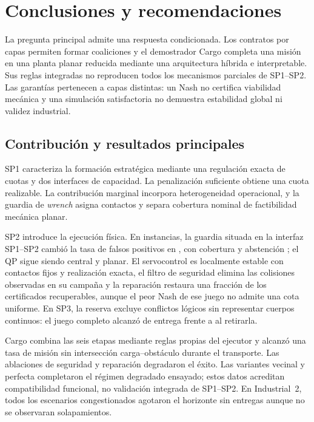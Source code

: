 \section{Conclusiones y recomendaciones}
\label{sec:conclusions}

La pregunta principal admite una respuesta condicionada. Los contratos por
capas permiten formar coaliciones y el demostrador Cargo completa una misión en
una planta planar reducida mediante una arquitectura híbrida e interpretable.
Sus reglas integradas no reproducen todos los mecanismos parciales de SP1--SP2. Las
garantías pertenecen a capas distintas: un Nash no certifica viabilidad mecánica
y una simulación satisfactoria no demuestra estabilidad global ni validez
industrial.

\subsection{Contribución y resultados principales}

SP1 caracteriza la formación estratégica mediante una regulación exacta de
cuotas y dos interfaces de capacidad. La penalización suficiente obtiene una
cuota realizable. La contribución marginal incorpora heterogeneidad operacional, y la guardia de \emph{wrench}
asigna contactos y separa cobertura nominal de factibilidad mecánica planar.

SP2 introduce la ejecución física. En \SPThreeWorlds{} instancias, la guardia
situada en la interfaz SP1--SP2 cambió la tasa de falsos positivos en
\SPThreeGuardEffect{}, con cobertura \SPThreeGuardedCoverage{} y abstención
\SPThreeGuardedAbstention{}; el QP sigue siendo central y planar. El
servocontrol es localmente estable con contactos fijos y realización exacta,
el filtro de seguridad elimina las colisiones observadas en su campaña y la
reparación restaura una fracción \SPSixConditionalRestore{} de los certificados
recuperables, aunque el peor Nash de ese juego no admite una cota uniforme. En SP3, la reserva excluye conflictos lógicos sin representar
cuerpos continuos: el juego completo alcanzó \SPSevenProposedSuccess{} de
entrega frente a \SPSevenNoReservationSuccess{} al retirarla.

Cargo combina las seis etapas mediante reglas propias del ejecutor y alcanzó
una tasa de misión \CargoEtwoESuccess{} sin intersección carga--obstáculo durante
el transporte. Las ablaciones de seguridad y reparación degradaron el éxito.
Las variantes vecinal y perfecta completaron el régimen degradado ensayado;
estos datos acreditan compatibilidad funcional, no validación integrada de
SP1--SP2. En Industrial~2, todos los escenarios congestionados agotaron el
horizonte sin entregas aunque no se observaran solapamientos.

